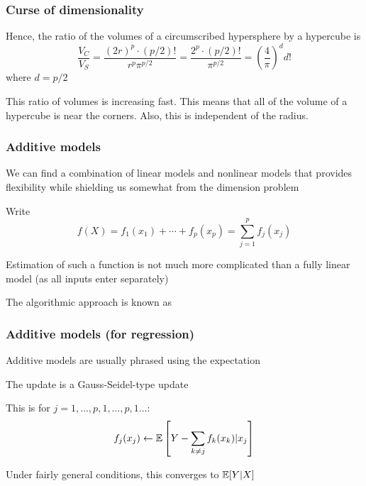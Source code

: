 \documentclass[12pt]{beamer}
\begin{document}
\begin{frame}[fragile]
\frametitle{Curse of dimensionality}
Hence, the ratio of the volumes of a circumscribed hypersphere by a hypercube is
\[
\frac{V_C}{V_S} =  \frac{(2r)^p\cdot (p/2)!}{r^{p}\pi^{p/2}} = \frac{2^p\cdot (p/2)!}{\pi^{p/2}}  = \left(\frac{4}{\pi}\right)^d d!
\]
where $d = p/2$

\vsp
{} This ratio of volumes is increasing  fast.  This means that all of the volume
of a hypercube is near the corners.  Also, this is independent of the radius.
\end{frame}


\begin{frame}[fragile]
\frametitle{Additive models}
We can find a combination of linear models and nonlinear models that provides flexibility
while shielding us somewhat from the dimension problem

\vsp
Write
\[
f(X) = f_1(x_1) + \cdots + f_p(x_p) = \sum_{j=1}^p f_j(x_j)
\]

\vsp
Estimation of such a function is not much more complicated than a fully linear model (as all inputs enter
separately)

\vsp
The algorithmic approach is known as 

\end{frame}

\begin{frame}[fragile]
\frametitle{Additive models (for regression)}
Additive models are usually phrased using the  expectation


\vsp
The update is a Gauss-Seidel-type update


\vsp
This is for $j=1,\ldots,p,1,\ldots,p,1\ldots$:
\[
f_j(x_j) \leftarrow \mathbb{E}\left[ Y - \sum_{k\neq j} f_k(x_k)| x_j\right]
\]

\vsp
Under fairly general conditions, this converges to $\mathbb{E}[Y | X]$

\end{frame}
\end{document}
